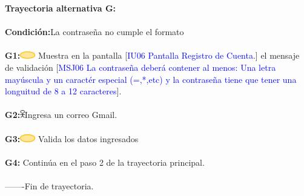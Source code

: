                     \textbf{Trayectoria alternativa G:}\\\\
                        \textbf{Condición:}La contraseña no cumple el formato\\\\
                        \textbf{G1:}\includegraphics[width=0.0500\textwidth]{Figuras/sistema.png} Muestra en la pantalla [\textcolor{blue}{IU06 Pantalla Registro de Cuenta}.] el mensaje de validación [\textcolor{blue}{MSJ06 La contraseña deberá contener al menos: Una letra mayúscula y un caractér especial (=,*,etc) y la contraseña tiene que tener una longuitud de 8 a 12 caracteres}].  \\\\
                        \textbf{G2:}\includegraphics[width=0.0150\textwidth]{Figuras/persona.png}Ingresa un correo Gmail.\\\\
                        \textbf{G3:}\includegraphics[width=0.0500\textwidth]{Figuras/sistema.png} Valida los datos ingresados\\\\ 
                        \textbf{G4:} Continúa en el paso 2 de la trayectoria principal. \\\\
                       
        -------Fin de  trayectoria. \\\\

